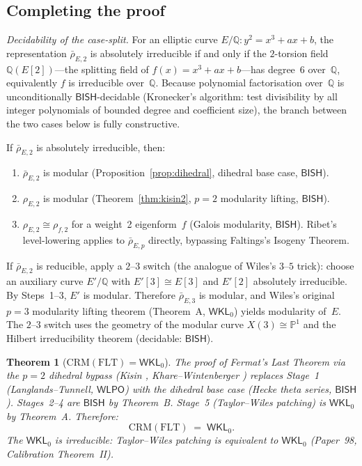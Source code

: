 \documentclass[11pt]{article}
\theoremstyle{plain}
\newtheorem{theorem}{Theorem}[section]
\theoremstyle{definition}
\theoremstyle{remark}
\newcommand{\Q}{\mathbb{Q}}
\newcommand{\CRM}{\mathrm{CRM}}
\newcommand{\BISH}{\mathsf{BISH}}
\newcommand{\WLPO}{\mathsf{WLPO}}
\newcommand{\WKL}{\mathsf{WKL}_0}
\begin{document}
\subsection{Completing the proof}

\emph{Decidability of the case-split.}  For an elliptic curve
$E/\Q\colon y^2 = x^3 + ax + b$, the representation
$\bar{\rho}_{E,2}$ is absolutely irreducible if and only if the
$2$-torsion field $\Q(E[2])$---the splitting field of
$f(x) = x^3 + ax + b$---has degree~$6$ over~$\Q$, equivalently
$f$ is irreducible over~$\Q$.  Because polynomial factorisation
over~$\Q$ is unconditionally $\BISH$-decidable (Kronecker's
algorithm: test divisibility by all integer polynomials of
bounded degree and coefficient size), the branch between the two
cases below is fully constructive.

If $\bar{\rho}_{E,2}$ is absolutely irreducible, then:
\begin{enumerate}[nosep]
\item $\bar{\rho}_{E,2}$ is modular (Proposition~\ref{prop:dihedral},
  dihedral base case, $\BISH$).
\item $\rho_{E,2}$ is modular (Theorem~\ref{thm:kisin2},
  $p = 2$ modularity lifting, $\BISH$).
\item $\rho_{E,2} \cong \rho_{f,2}$ for a weight~2
  eigenform~$f$ (Galois modularity, $\BISH$).  Ribet's
  level-lowering applies to $\bar{\rho}_{E,p}$ directly,
  bypassing Faltings's Isogeny Theorem.
\end{enumerate}

If $\bar{\rho}_{E,2}$ is reducible, apply a $2$--$3$ switch
(the analogue of Wiles's $3$--$5$ trick): choose an auxiliary
curve $E'/\Q$ with $E'[3] \cong E[3]$ and $E'[2]$ absolutely
irreducible.  By Steps~1--3, $E'$ is modular.  Therefore
$\bar{\rho}_{E,3}$ is modular, and Wiles's original $p = 3$
modularity lifting theorem (Theorem~A, $\WKL$) yields
modularity of~$E$.  The $2$--$3$ switch uses the geometry of
the modular curve $X(3) \cong \mathbb{P}^1$ and the Hilbert
irreducibility theorem (decidable: $\BISH$).

\begin{theorem}[$\CRM(\mathrm{FLT}) = \WKL$]%
\label{thm:flt-wkl}
The proof of Fermat's Last Theorem via the $p = 2$ dihedral
bypass (Kisin \cite{Kisin2009}, Khare--Wintenberger
\cite{KhareWintenberger2009I}) replaces Stage~1
(Langlands--Tunnell, $\WLPO$) with the dihedral base case
(Hecke theta series, $\BISH$).  Stages~2--4 are $\BISH$ by
Theorem~B.  Stage~5 (Taylor--Wiles patching) is $\WKL$ by
Theorem~A.  Therefore:
\[
  \CRM(\mathrm{FLT}) \;=\; \WKL.
\]
The $\WKL$ is irreducible: Taylor--Wiles patching is equivalent
to $\WKL$ (Paper~98, Calibration Theorem~II).
\end{theorem}
\end{document}
